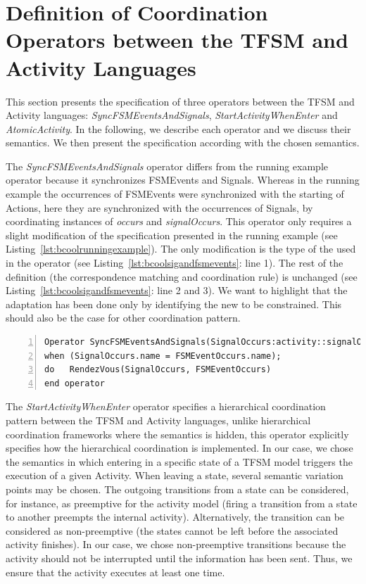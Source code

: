\section{Definition of Coordination Operators between the TFSM and Activity Languages}
This section presents the \bcool specification of three operators between the TFSM and Activity languages: \emph{SyncFSMEventsAndSignals}, \emph{StartActivityWhenEnter} and \emph{AtomicActivity}. In the following, we describe each operator and we discuss their semantics. We then present the \bcool specification according with the chosen semantics.  
	
The \emph{SyncFSMEventsAndSignals} operator differs from the running example operator because it synchronizes FSMEvents and Signals. Whereas in the running example the occurrences of FSMEvents were synchronized with the starting of Actions, here they are synchronized with the occurrences of Signals, \ie by coordinating instances of \dse \emph{occurs} and \emph{signalOccurs}. This operator only requires a slight modification of the specification presented in the running example (see Listing~\ref{lst:bcoolrunningexample}). The only modification is the type of the \dse used in the operator (see Listing~\ref{lst:bcoolsigandfsmevents}: line 1). The rest of the definition (\ie the correspondence matching and coordination rule) is unchanged (see Listing~\ref{lst:bcoolsigandfsmevents}: line 2 and 3). We want to highlight that the adaptation has been done only by identifying the new \dse to be constrained. This should also be the case for other coordination pattern.
		 
\begin{lstlisting}[language=bcool,
caption={\bcool specification of the \emph{SyncFSMEventsAndSignals} operator},
label={lst:bcoolsigandfsmevents}, 
basicstyle=\scriptsize\ttfamily, backgroundcolor=\color{LGrey}, numbers=left, xleftmargin=2pt]
Operator SyncFSMEventsAndSignals(SignalOccurs:activity::signalOccurs, FSMEventOccurs:tfsm::occurs)
when (SignalOccurs.name = FSMEventOccurs.name);
do   RendezVous(SignalOccurs, FSMEventOccurs)
end operator
\end{lstlisting}
	 
	 
	 
The \emph{StartActivityWhenEnter} operator specifies a hierarchical coordination pattern between the TFSM and Activity languages, unlike hierarchical coordination frameworks where the semantics is hidden, this operator explicitly specifies how the hierarchical coordination is implemented. In our case, we chose the semantics in which entering in a specific state of a TFSM model triggers the execution of a given Activity. When leaving a state, several semantic variation points may be chosen. The outgoing transitions from a state can be considered, for instance, as preemptive for the activity model (\ie firing a transition from a state to another preempts the internal activity). Alternatively, the transition can be considered as non-preemptive (\ie the states cannot be left before the associated activity finishes). In our case, we chose non-preemptive transitions because the activity should not be interrupted until the information has been sent. Thus, we ensure that the activity executes at least one time.  


